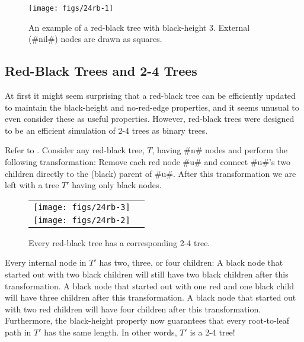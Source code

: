 \begin{figure}
  \begin{center}
    \texttt{[image: figs/24rb-1]}
  \end{center}
  \caption[A red-black tree]{An example of a red-black tree with black-height 3.  External (#nil#) nodes are drawn as squares.} 
\end{figure}


\subsection{Red-Black Trees and 2-4 Trees}

At first it might seem surprising that a red-black tree can be efficiently
updated to maintain the black-height and no-red-edge properties, and
it seems unusual to even consider these as useful properties.  However,
red-black trees were designed to be an efficient simulation of 2-4 trees
as binary trees.

Refer to .
Consider any red-black tree, $T$, having #n# nodes and perform the
following transformation: Remove each red node #u# and connect #u#'s two
children directly to the (black) parent of #u#.  After this transformation
we are left with a tree $T'$ having only black nodes.
\begin{figure}
  \begin{center}
    \begin{tabular}{cc}
      \texttt{[image: figs/24rb-3]} \\
      \texttt{[image: figs/24rb-2]}
    \end{tabular}
  \end{center}
  \caption{Every red-black tree has a corresponding 2-4 tree.}
\end{figure}

Every internal node in $T'$ has two, three, or four children: A black
node that started out with two black children will still have two
black children after this transformation.  A black node that started
out with one red and one black child will have three children after this
transformation.  A black node that started out with two red children will
have four children after this transformation.  Furthermore, the black-height
property now guarantees that every root-to-leaf path in $T'$ has the
same length.  In other words, $T'$ is a 2-4 tree!

